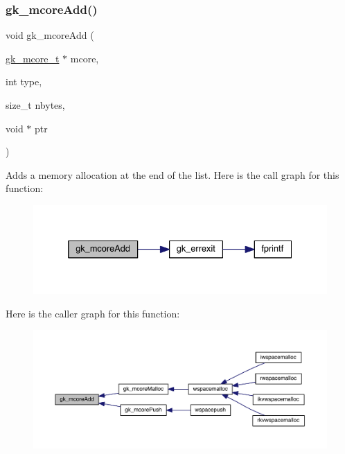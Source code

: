 \subsubsection{\texorpdfstring{gk\+\_\+mcore\+Add()}{gk\_mcoreAdd()}}
{\footnotesize\ttfamily void gk\+\_\+mcore\+Add (\begin{DoxyParamCaption}\item[{\hyperlink{a00682}{gk\+\_\+mcore\+\_\+t} $\ast$}]{mcore,  }\item[{int}]{type,  }\item[{size\+\_\+t}]{nbytes,  }\item[{void $\ast$}]{ptr }\end{DoxyParamCaption})}

Adds a memory allocation at the end of the list. Here is the call graph for this function\+:\nopagebreak
\begin{figure}[H]
\begin{center}
\leavevmode
\includegraphics[width=332pt]{a00107_a366348b623d380f773e5946011e14059_cgraph}
\end{center}
\end{figure}
Here is the caller graph for this function\+:\nopagebreak
\begin{figure}[H]
\begin{center}
\leavevmode
\includegraphics[width=350pt]{a00107_a366348b623d380f773e5946011e14059_icgraph}
\end{center}
\end{figure}
\mbox{\label{a00107_aba5df0f5155d88c0331fd6c996b483ed}} 
